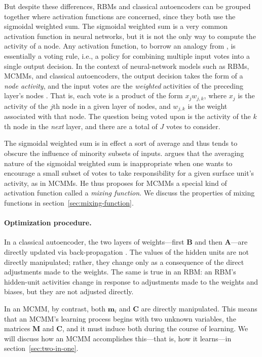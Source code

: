 But despite these differences, RBMs and classical autoencoders can be grouped together where activation functions are concerned, since they both use the sigmoidal weighted sum.
The sigmoidal weighted sum is a very common activation function in neural networks, 
but it is not the only way to compute the activity of a node. Any activation function, to borrow
an analogy from \citet{saund:94}, is essentially a voting rule, i.e.,  a policy 
for combining multiple input votes into a single output decision.  
In the context of neural-network models such as RBMs, MCMMs, and 
classical autoencoders, the output decision takes the form of a \emph{node activity},
and the input votes are the \emph{weighted} activities of the preceding layer's nodes \citep{hinton:1987trans}. 
That is, each vote is a product of the form $x_{j} w_{j,k}$, where $x_{j}$ is the activity 
of the $j$th node in a given layer of nodes, and $w_{j,k}$ is the weight associated with that 
node. The question being voted upon is the activity of the $k$th node in the 
\emph{next} layer, and there are
a total of $J$ votes to consider.

The sigmoidal weighted sum is in effect a sort of average and thus tends to obscure
the influence of minority subsets of inputs. \citet{saund:94} argues 
that the averaging nature of the sigmoidal weighted sum is inappropriate when one wants to encourage
a small subset of votes to take responsibility for a given surface unit's activity, as in MCMMs.
He thus proposes for MCMMs a special kind of activation function called a \emph{mixing function}.
We discuss the properties of mixing functions in 
section~\ref{sec:mixing-function}.

\paragraph{Optimization procedure.}  In a classical autoencoder, the two layers of 
weights---first $\textbf{B}$ and then $\textbf{A}$---are directly updated via 
back-propagation \citep{rumelhart-et-al:1985}.
The values of the hidden units are not directly manipulated; rather, they change  
only as a 
consequence of the direct adjustments made to the weights. The same is true in an RBM: 
an RBM's hidden-unit activities change in response to adjustments 
made to the weights and biases, but they are not
adjusted directly.

In an MCMM, by contrast, both $\textbf{m}_i$ and $\textbf{C}$ are directly manipulated. This means that
an MCMM's learning process begins with two unknown variables, the matrices $\textbf{M}$ and 
$\textbf{C}$, and it must induce both during the course of learning. We will discuss how an MCMM accomplishes this---that is, how it learns---in section~\ref{sec:two-in-one}.

